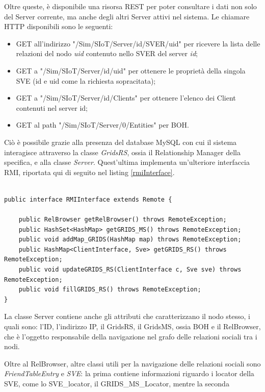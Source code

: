 Oltre queste, è disponibile una risorsa REST per poter consultare i dati non solo del Server corrente, ma anche degli altri Server attivi nel sistema. Le chiamare HTTP disponibili sono le seguenti:

\begin{itemize}
    \item GET all'indirizzo "/Sim/SIoT/Server/{id}/SVER/{uid}" per ricevere la lista delle relazioni del nodo \textit{uid} contenuto nello SVER del server \textit{id};
    \item GET a "/Sim/SIoT/Server/{id}/{uid}" per ottenere le proprietà della singola SVE (id e uid come la richiesta sopracitata);
    \item GET a "/Sim/SIoT/Server/{id}/Clients" per ottenere l'elenco dei Client contenuti nel server {id};
    \item GET al path "/Sim/SIoT/Server/0/Entities" per BOH. 
    
\end{itemize}

Ciò è possibile grazie alla presenza del database MySQL con cui il sistema interagisce attraverso la classe \textit{GridsRS}, ossia il Relationship Manager della specifica, e alla classe \textit{Server}. Quest'ultima implementa un'ulteriore interfaccia RMI, riportata qui di seguito nel listing \ref{rmiInterface}.


\begin{lstlisting}[caption={RMIInterface.java},label={rmiInterface},style={c}]

public interface RMIInterface extends Remote {

    public RelBrowser getRelBrowser() throws RemoteException;
    public HashSet<HashMap> getGRIDS_MS() throws RemoteException;
    public void addMap_GRIDS(HashMap map) throws RemoteException;
    public HashMap<ClientInterface, Sve> getGRIDS_RS() throws RemoteException;
    public void updateGRIDS_RS(ClientInterface c, Sve sve) throws RemoteException;
    public void fillGRIDS_RS() throws RemoteException;
}
\end{lstlisting}

La classe Server contiene anche gli attributi che caratterizzano il nodo stesso, i quali sono: l'ID, l'indirizzo IP, il GridsRS, il GridsMS, ossia BOH 
e il RelBrowser, che è l'oggetto responsabile della navigazione nel grafo delle relazioni sociali tra i nodi.

Oltre al RelBrowser, altre classi utili per la navigazione delle relazioni sociali sono \textit{FriendTableEntry} e \textit{SVE}: la prima contiene informazioni riguardo i locator della SVE, come lo SVE\_locator, il GRIDS\_MS\_Locator, mentre la seconda%

